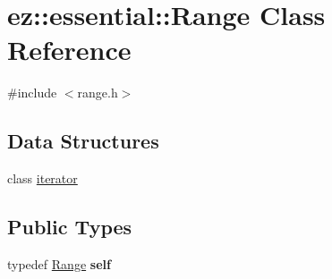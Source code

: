\hypertarget{classez_1_1essential_1_1Range}{}\section{ez\+:\+:essential\+:\+:Range Class Reference}
\label{classez_1_1essential_1_1Range}


{\ttfamily \#include $<$range.\+h$>$}

\subsection*{Data Structures}
\begin{DoxyCompactItemize}
\item 
class \hyperlink{classez_1_1essential_1_1Range_1_1iterator}{iterator}
\end{DoxyCompactItemize}
\subsection*{Public Types}
\begin{DoxyCompactItemize}
\item 
\mbox{\label{classez_1_1essential_1_1Range_a0cb0cd46dfcb6bfcc50bcdad064191df}} 
typedef \hyperlink{classez_1_1essential_1_1Range}{Range} {\bfseries self}
\end{DoxyCompactItemize}
